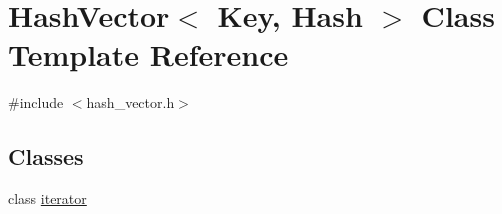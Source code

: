 \hypertarget{class_hash_vector}{}\section{Hash\+Vector$<$ Key, Hash $>$ Class Template Reference}
\label{class_hash_vector}


{\ttfamily \#include $<$hash\+\_\+vector.\+h$>$}

\subsection*{Classes}
\begin{DoxyCompactItemize}
\item 
class \mbox{\hyperlink{class_hash_vector_1_1iterator}{iterator}}
\end{DoxyCompactItemize}
